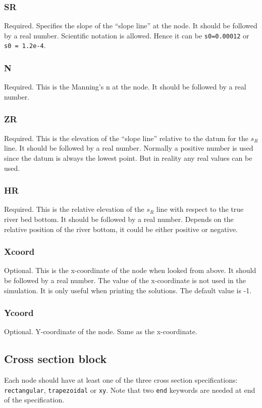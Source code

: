 \documentclass[10pt, letterpaper]{article}
\begin{document}
\subsubsection{SR}
\label{subsubsec:s0}
Required. Specifies the slope of the ``slope line'' at the node. It should be followed by
a real number. Scientific notation is allowed. Hence it can be {\tt s0=0.00012} or {\tt s0
  = 1.2e-4}.

\subsubsection{N}
\label{subsubsec:n}
Required. This is the Manning's n at the node. It should be followed by a real number.

\subsubsection{ZR}
\label{subsubsec:z0}
Required. This is the elevation of the ``slope line'' relative to the datum for the $s_R$
line. It should be followed by a real number. Normally a positive number is used since the
datum is always the lowest point. But in reality any real values can be used.

\subsubsection{HR}
\label{subsubsec:h0}
Required. This is the relative elevation of the $s_R$ line with respect to the true river
bed bottom. It should be followed by a real number. Depends on the relative position of
the river bottom, it could be either positive or negative.

\subsubsection{Xcoord}
\label{subsubsec:xcoord}
Optional. This is the x-coordinate of the node when looked from above. It should be
followed by a real number. The value of the x-coordinate is not used in the
simulation. It is only useful when printing the solutions. The default value is -1.

\subsubsection{Ycoord}
\label{subsubsec:ycoord}
Optional. Y-coordinate of the node. Same as the x-coordinate.

\subsection{Cross section block}
\label{subsubsec:xsec}
Each node should have at least one of the three cross section specifications: {\tt
  rectangular}, {\tt trapezoidal} or {\tt xy}. Note that two {\tt end} keywords are needed
at end of the specification.
\end{document}
